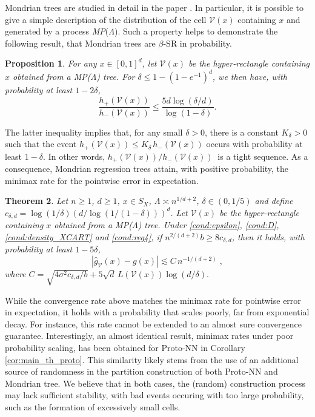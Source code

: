 \documentclass[paper=a4, fontsize=11pt]{scrartcl}
\newtheorem{theorem}{Theorem}
\newtheorem{proposition}[theorem]{Proposition}
\begin{document}
Mondrian trees are studied in detail in the paper \cite{minimaxmondrian}. In particular, it is possible to give a simple description of the distribution of the cell $\mathcal V(x)$ containing $x$ and generated by a process \textit{MP}($\Lambda $). Such a property helps to demonstrate the following result, that Mondrian trees are \(\beta\)-SR in probability.



\begin{proposition}\label{mondrian}
 For any $x\in [0,1] ^d$, let  $\mathcal V (x)$ be the hyper-rectangle containing $x$ obtained from a \textit{MP}($\Lambda $) tree. For $\delta \leq 1 - (1 - e^{-1})^d$, we then have, with probability at least \(1 - 2\delta\),
\[ \frac{h_+(\mathcal V (x))}{h_-(\mathcal V (x))} \leq \frac{5d \log(\delta/d)}{{\log(1-\delta)}}. \]
\end{proposition}

The latter inequality implies that, for any small $\delta>0$, there is a constant $K_\delta >0 $ such that  the event $h_+(\mathcal V (x)) \leq K_\delta \, h_-(\mathcal V (x))$ occurs with probability at least $1-\delta$. In other words,  ${h_+(\mathcal V (x))} /{h_-(\mathcal V (x))}~ $ is a tight sequence.
As a consequence, Mondrian regression trees attain, with positive probability, the minimax rate for the pointwise error in expectation.


\begin{theorem}\label{thm:mondrian}
Let  $n\geq 1$, $d\geq 1$, $x\in S_X$, $\Lambda  \asymp n^{1/d+2}$, $\delta\in (0,1/5)$ and define $c_{\delta,d} = \log(1/\delta) (d/ \log(1/(1-\delta)) )^d$. Let  $\mathcal V (x)$ be the hyper-rectangle  containing $x$ obtained from a \textit{MP}($\Lambda $) tree.
 Under \ref{cond:epsilon}, \ref{cond:D}, \ref{cond:density_XCART} and \ref{cond:reg4}, %
 if $n^{2/(d+2)} b \geq 8 c_{\delta,d} $, then it holds, with probability at least $1-5\delta$, 
\[
 | \hat g_{\mathcal V}(x) - g(x)| \lesssim
 C \, n^{-1/(d+2)}\; ,
\]
where $C = \sqrt{ {4\sigma^2  c_{\delta,d}} / {b }} +  5 \sqrt{d} \, L(\mathcal{ V } (x))\log(d/\delta).$
\end{theorem}

While the convergence rate above matches the minimax rate for pointwise error in expectation, it holds with a probability that scales poorly, far from exponential decay. For instance, this rate cannot be extended to an almost sure convergence guarantee. Interestingly, an almost identical result, minimax rates under poor probability scaling, has been obtained for Proto-NN in Corollary \ref{cor:main_th_proto}. This similarity likely stems from the use of an additional source of randomness in the partition construction of both Proto-NN and Mondrian tree. We believe that in both cases, the (random) construction process may lack sufficient stability, with bad events occuring with too large probability, such as the formation of excessively small cells.
\end{document}
